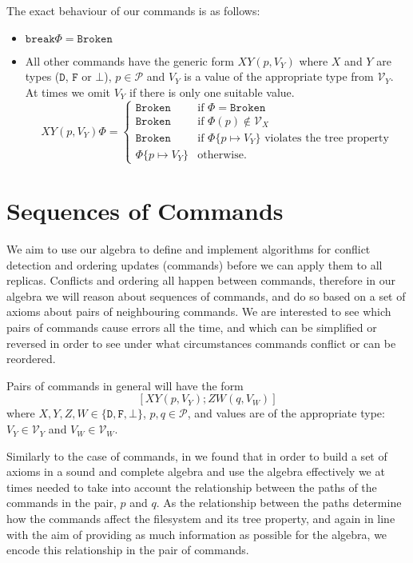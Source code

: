 \documentclass[12pt]{article}
\newcommand{\setvx}[1]{\mathcal{V}_{#1}}
\newcommand{\setp}{\mathcal{P}}
\newcommand{\empt}{\bot}
\newcommand{\fsbroken}{\mathtt{Broken}} %
\newcommand{\FS}{\Phi} %
\newcommand{\cbrk}{\mathtt{break}}
\newcommand{\fscommand}[2]{{#1#2}}
\newcommand{\fsregcommandchar}[1]{\mathtt{#1}}
\newcommand{\cxy}{\fscommand{X}{Y}}
\newcommand{\czw}{\fscommand{Z}{W}}
\theoremstyle{definition}
\begin{document}
The exact behaviour of our commands is as follows:
\begin{itemize}
\item $\cbrk\FS = \fsbroken$
\item
All other commands have the generic form $\cxy(p,V_Y)$ where
$X$ and $Y$ are types ($\fsregcommandchar{D}$, $\fsregcommandchar{F}$ or $\fsregcommandchar{\empt}$),
$p\in\setp$ and $V_Y$ is a value of the appropriate type from $\setvx{Y}$.
At times we omit $V_Y$ if there is only one suitable value.
\[ \cxy(p,V_Y)\FS = 
   \begin{cases}
   \fsbroken &\mbox{if~} \FS=\fsbroken\\
   \fsbroken &\mbox{if~} \FS(p)\not\in\setvx{X}\\
   \fsbroken &\mbox{if~} \FS\{p\mapsto V_Y\} \mbox{~violates the tree property}\\
   \FS\{p\mapsto V_Y\} &\mbox{otherwise.}
   \end{cases}
\]
\end{itemize}

\section{Sequences of Commands}

We aim to use our algebra to define and implement algorithms for conflict detection
and ordering updates (commands) before we can apply them to all replicas.
Conflicts and ordering all happen between commands, therefore in our algebra
we will reason about sequences of commands, 
and do so based on a set of axioms about pairs of neighbouring commands.
We are interested to see which pairs of commands cause errors all the time,
and which can be simplified or reversed
in order to see under what circumstances commands conflict or can be reordered.

Pairs of commands in general will have the form
\[ [\cxy(p,V_Y); \czw(q,V_W)] \]
where $X,Y,Z,W\in\{\fsregcommandchar{D},\fsregcommandchar{F},\empt\}$, $p,q\in\setp$, 
and values are of the appropriate type: 
$V_Y\in\setvx{Y}$ and $V_W\in\setvx{W}$.

Similarly to the case of commands, in \cite{NREC:alg} we found that in order to build
a set of axioms in a sound and complete algebra and use the algebra effectively we at times needed to take into account
the relationship between the paths of the commands in the pair, $p$ and $q$.
As the relationship between the paths determine how the commands affect the filesystem
and its tree property, 
and again in line with the aim of providing as much information as possible for the algebra,
we encode this relationship in the pair of commands.
\end{document}
